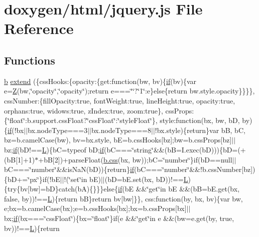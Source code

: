 \hypertarget{a00039}{}\section{doxygen/html/jquery.js File Reference}
\label{a00039}
\subsection*{Functions}
\begin{DoxyCompactItemize}
\item 
\hyperlink{a00039_a2fa551895933fae935a0a6b87282241d}{b} \hyperlink{a00039_a5fb206c91c64d1be35fde236706eab86}{extend} (\{css\+Hooks\+:\{opacity\+:\{get\+:function(bw, bv)\{\hyperlink{a00039_a42cbfadee2b4749e8f699ea8d745a0e4}{if}(bv)\{var e=\hyperlink{a00039_adc18d83abfd9f87d396e8fd6b6ac0fe1}{Z}(bw,\char`\"{}opacity\char`\"{},\char`\"{}opacity\char`\"{});return e===\char`\"{}\char`\"{}?\char`\"{}1\char`\"{}\+:e\}else\{return bw.\+style.\+opacity\}\}\}\}, css\+Number\+:\{fill\+Opacity\+:true, font\+Weight\+:true, line\+Height\+:true, opacity\+:true, orphans\+:true, widows\+:true, z\+Index\+:true, zoom\+:true\}, css\+Props\+:\{\char`\"{}float\char`\"{}\+:b.\+support.\+css\+Float?\char`\"{}css\+Float\char`\"{}\+:\char`\"{}style\+Float\char`\"{}\}, style\+:function(bx, bw, b\+D, by)\{\hyperlink{a00039_a42cbfadee2b4749e8f699ea8d745a0e4}{if}(!bx$\vert$$\vert$bx.\+node\+Type===3$\vert$$\vert$bx.\+node\+Type===8$\vert$$\vert$!bx.\+style)\{return\}var b\+B, b\+C, bz=b.\+camel\+Case(bw), bv=bx.\+style, b\+E=b.\+css\+Hooks\mbox{[}bz\mbox{]};bw=b.\+css\+Props\mbox{[}bz\mbox{]}$\vert$$\vert$bz;\hyperlink{a00039_a42cbfadee2b4749e8f699ea8d745a0e4}{if}(b\+D!==\hyperlink{a00039_a38ee4c0b5f4fe2a18d0c783af540d253}{L})\{b\+C=typeof b\+D;\hyperlink{a00039_a42cbfadee2b4749e8f699ea8d745a0e4}{if}(b\+C===\char`\"{}string\char`\"{}\&\&(b\+B=I.\+exec(b\+D)))\{b\+D=(+(b\+B\mbox{[}1\mbox{]}+1)$\ast$+b\+B\mbox{[}2\mbox{]})+parse\+Float(\hyperlink{a00039_a89ad527fcd82c01ebb587332f5b4fcd4}{b.\+css}(bx, bw));b\+C=\char`\"{}number\char`\"{}\}if(b\+D==null$\vert$$\vert$b\+C===\char`\"{}number\char`\"{}\&\&is\+Na\+N(b\+D))\{return\}\hyperlink{a00039_a42cbfadee2b4749e8f699ea8d745a0e4}{if}(b\+C===\char`\"{}number\char`\"{}\&\&!b.\+css\+Number\mbox{[}bz\mbox{]})\{b\+D+=\char`\"{}px\char`\"{}\}if(!b\+E$\vert$$\vert$!(\char`\"{}set\char`\"{}in b\+E)$\vert$$\vert$(b\+D=b\+E.\+set(bx, b\+D))!==\hyperlink{a00039_a38ee4c0b5f4fe2a18d0c783af540d253}{L})\{try\{bv\mbox{[}bw\mbox{]}=b\+D\}catch(b\+A)\{\}\}\}else\{\hyperlink{a00039_a42cbfadee2b4749e8f699ea8d745a0e4}{if}(b\+E \&\&\char`\"{}get\char`\"{}in b\+E \&\&(b\+B=b\+E.\+get(bx, false, by))!==\hyperlink{a00039_a38ee4c0b5f4fe2a18d0c783af540d253}{L})\{return b\+B\}return bv\mbox{[}bw\mbox{]}\}\}, css\+:function(by, bx, bv)\{var bw, e;bx=b.\+camel\+Case(bx);e=b.\+css\+Hooks\mbox{[}bx\mbox{]};bx=b.\+css\+Props\mbox{[}bx\mbox{]}$\vert$$\vert$bx;\hyperlink{a00039_a42cbfadee2b4749e8f699ea8d745a0e4}{if}(bx===\char`\"{}css\+Float\char`\"{})\{bx=\char`\"{}float\char`\"{}\}if(e \&\&\char`\"{}get\char`\"{}in e \&\&(bw=e.\+get(by, true, bv))!==\hyperlink{a00039_a38ee4c0b5f4fe2a18d0c783af540d253}{L})\{return 
\end{DoxyCompactItemize}
